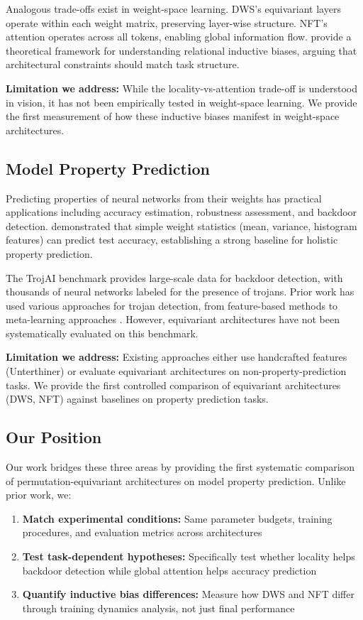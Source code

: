 Analogous trade-offs exist in weight-space learning. DWS's equivariant layers operate within each weight matrix, preserving layer-wise structure. NFT's attention operates across all tokens, enabling global information flow. \citet{battaglia2018relational} provide a theoretical framework for understanding relational inductive biases, arguing that architectural constraints should match task structure.

\textbf{Limitation we address:} While the locality-vs-attention trade-off is understood in vision, it has not been empirically tested in weight-space learning. We provide the first measurement of how these inductive biases manifest in weight-space architectures.

\subsection{Model Property Prediction}

Predicting properties of neural networks from their weights has practical applications including accuracy estimation, robustness assessment, and backdoor detection. \citet{unterthiner2020predicting} demonstrated that simple weight statistics (mean, variance, histogram features) can predict test accuracy, establishing a strong baseline for holistic property prediction.

The TrojAI benchmark \cite{nist_trojai} provides large-scale data for backdoor detection, with thousands of neural networks labeled for the presence of trojans. Prior work has used various approaches for trojan detection, from feature-based methods to meta-learning approaches \cite{wang2019neural}. However, equivariant architectures have not been systematically evaluated on this benchmark.

\textbf{Limitation we address:} Existing approaches either use handcrafted features (Unterthiner) or evaluate equivariant architectures on non-property-prediction tasks. We provide the first controlled comparison of equivariant architectures (DWS, NFT) against baselines on property prediction tasks.

\subsection{Our Position}

Our work bridges these three areas by providing the first systematic comparison of permutation-equivariant architectures on model property prediction. Unlike prior work, we:

\begin{enumerate}
    \item \textbf{Match experimental conditions:} Same parameter budgets, training procedures, and evaluation metrics across architectures
    \item \textbf{Test task-dependent hypotheses:} Specifically test whether locality helps backdoor detection while global attention helps accuracy prediction
    \item \textbf{Quantify inductive bias differences:} Measure how DWS and NFT differ through training dynamics analysis, not just final performance
\end{enumerate}
